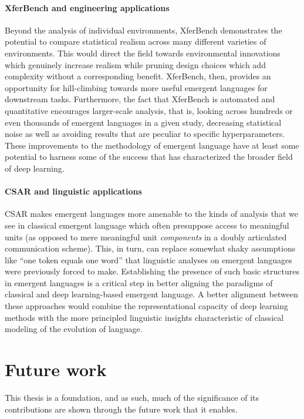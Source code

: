 
\paragraph{XferBench and engineering applications}
Beyond the analysis of individual environments, XferBench demonstrates the potential to compare statistical realism across many different varieties of environments.
This would direct the field towards environmental innovations which genuinely increase realism while pruning design choices which add complexity without a corresponding benefit.
XferBench, then, provides an opportunity for hill-climbing towards more useful emergent languages for downstream tasks.
Furthermore, the fact that XferBench is automated and quantitative encourages larger-scale analysis, that is, looking across hundreds or even thousands of emergent languages in a given study, decreasing statistical noise as well as avoiding results that are peculiar to specific hyperparameters.
These improvements to the methodology of emergent language have at least some potential to harness some of the success that has characterized the broader field of deep learning.


\paragraph{CSAR and linguistic applications}
CSAR makes emergent languages more amenable to the kinds of analysis that we see in classical emergent language which often presuppose access to meaningful units (as opposed to mere meaningful unit \emph{components} in a doubly articulated communication scheme).
This, in turn, can replace somewhat shaky assumptions like ``one token equals one word'' that linguistic analyses on emergent languages were previously forced to make.
Establishing the presence of such basic structures in emergent languages is a critical step in better aligning the paradigms of classical and deep learning-based emergent language.
A better alignment between these approaches would combine the representational capacity of deep learning methods with the more principled linguistic insights characteristic of classical modeling of the evolution of language.


\section{Future work}
This thesis is a foundation, and as such, much of the significance of its contributions are shown through the future work that it enables.

